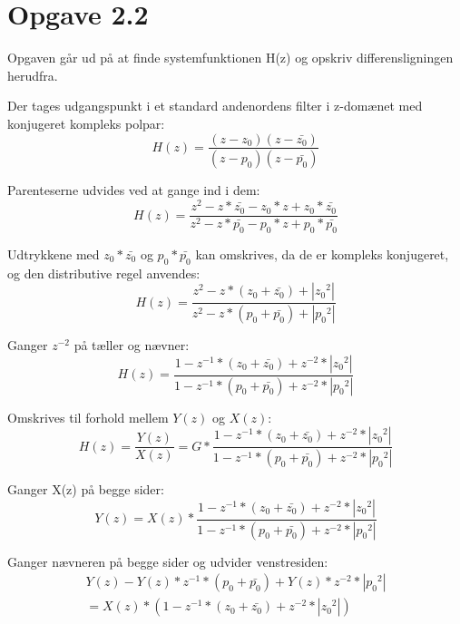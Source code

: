 \documentclass[a4paper,onecolumn,oneside]{report}
\begin{document}
\chapter{Opgave 2.2}
Opgaven går ud på at finde systemfunktionen H(z) og opskriv differensligningen herudfra.

Der tages udgangspunkt i et standard andenordens filter i z-domænet med konjugeret kompleks polpar:
\begin{equation}
    H(z)= \frac{(z-z_0)(z-\bar{z_0})}{(z-p_0)(z-\bar{p_0})}
\end{equation}

Parenteserne udvides ved at gange ind i dem:
\begin{equation}
    H(z)=\frac{z^2 - z*\bar{z_0} - z_0*z + z_0*\bar{z_0}}{z^2 - z*\bar{p_0} - p_0*z + p_0*\bar{p_0}} 
\end{equation}

Udtrykkene med $z_0*\bar{z_0}$ og $p_0*\bar{p_0}$ kan omskrives, da de er kompleks konjugeret, og den distributive regel anvendes:
\begin{equation}
    H(z)=\frac{z^2 - z*(z_0+\bar{z_0}) + |{z_0}^2|}{z^2 - z*(p_0 +\bar{p_0}) + |{p_0}^2|} 
\end{equation}

Ganger $z^{-2}$ på tæller og nævner:
\begin{equation}
    H(z)= \frac{1 - z^{-1}*(z_0+\bar{z_0}) + z^{-2}*|{z_0}^2|}{1 - z^{-1}*(p_0 +\bar{p_0}) + z^{-2}*|{p_0}^2|} 
\end{equation}

Omskrives til forhold mellem $Y(z)$ og $X(z)$:
\begin{equation}
    H(z)= \frac{Y(z)}{X(z)} = G * \frac{1 - z^{-1}*(z_0+\bar{z_0}) + z^{-2}*|{z_0}^2|}{1 - z^{-1}*(p_0 +\bar{p_0}) + z^{-2}*|{p_0}^2|} 
\end{equation}

Ganger X(z) på begge sider:
\begin{equation}
    Y(z) = X(z)  * \frac{1 - z^{-1}*(z_0+\bar{z_0}) + z^{-2}*|{z_0}^2|}{1 - z^{-1}*(p_0 +\bar{p_0}) + z^{-2}*|{p_0}^2|}
\end{equation}

Ganger nævneren på begge sider og udvider venstresiden:
\begin{equation}
    \begin{split}
        Y(z) - Y(z)* z^{-1}*(p_0 +\bar{p_0}) + Y(z)*z^{-2}*|{p_0}^2| \\
        = X(z) * (1 - z^{-1}*(z_0+\bar{z_0}) + z^{-2}*|{z_0}^2|)        
    \end{split}
\end{equation}
\end{document}
